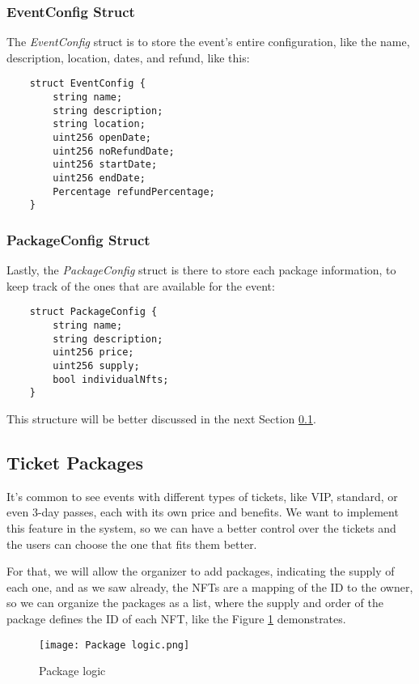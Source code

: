 \subsubsection{EventConfig Struct}

The \textit{EventConfig} struct is to store the event's entire configuration, like the name, description, location, dates, and refund, like this:
\begin{verbatim}
    struct EventConfig {
        string name;
        string description;
        string location;
        uint256 openDate;
        uint256 noRefundDate;
        uint256 startDate;
        uint256 endDate;
        Percentage refundPercentage;
    }
\end{verbatim}

\subsubsection{PackageConfig Struct}

Lastly, the \textit{PackageConfig} struct is there to store each package information, to keep track of the ones that are available for the event:
\begin{verbatim}
    struct PackageConfig {
        string name;
        string description;
        uint256 price;
        uint256 supply;
        bool individualNfts;
    }
\end{verbatim}
This structure will be better discussed in the next Section \ref{subsec:ticket_packages}.

\subsection{Ticket Packages}
\label{subsec:ticket_packages}

It's common to see events with different types of tickets, like VIP, standard, or even 3-day passes, each with its own price and benefits. We want to implement this feature in the system, so we can have a better control over the tickets and the users can choose the one that fits them better.

For that, we will allow the organizer to add packages, indicating the supply of each one, and as we saw already, the NFTs are a mapping of the ID to the owner, so we can organize the packages as a list, where the supply and order of the package defines the ID of each NFT, like the Figure \ref{fig:package_logic} demonstrates.

\begin{figure}[H]
    \texttt{[image: Package logic.png]}
    \centering
    \caption{Package logic}
    \label{fig:package_logic}
\end{figure}

